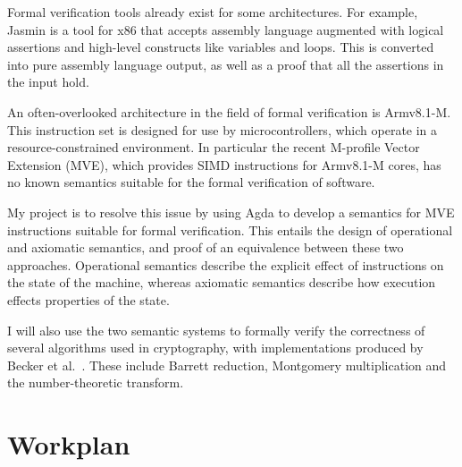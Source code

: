 \documentclass[11pt]{article}
\begin{document}
Formal verification tools already exist for some architectures. For example,
Jasmin is a tool for x86 that accepts assembly language augmented with logical
assertions and high-level constructs like variables and loops. This is
converted into pure assembly language output, as well as a proof that all the
assertions in the input hold.

An often-overlooked architecture in the field of formal verification is
Armv8.1-M. This instruction set is designed for use by microcontrollers, which
operate in a resource-constrained environment. In particular the recent
M-profile Vector Extension (MVE), which provides SIMD instructions for
Armv8.1-M cores, has no known semantics suitable for the formal verification
of software.

My project is to resolve this issue by using Agda to develop a semantics for
MVE instructions suitable for formal verification. This entails the design of
operational and axiomatic semantics, and proof of an equivalence between these
two approaches. Operational semantics describe the explicit effect of
instructions on the state of the machine, whereas axiomatic semantics describe
how execution effects properties of the state.

I will also use the two semantic systems to formally verify the correctness of
several algorithms used in cryptography, with implementations produced by
Becker et al.\ \cite{cryptoeprint_2021_998}. These include Barrett reduction,
Montgomery multiplication and the number-theoretic transform.

\section{Workplan}
\label{sec:org96415de}
\end{document}
